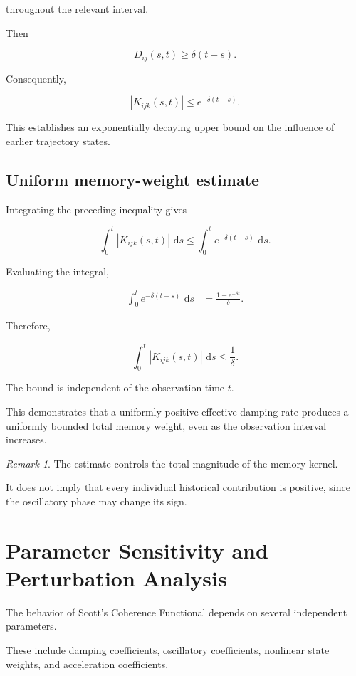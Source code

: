 \documentclass[12pt]{article}
\numberwithin{equation}{section}
\newcommand{\dd}{\,\mathrm{d}}
\theoremstyle{definition}
\theoremstyle{remark}
\newtheorem{remark}[theorem]{Remark}
\begin{document}
throughout the relevant interval.

Then

\[
D_{ij}(s,t)
\geq\delta(t-s).
\]

Consequently,

\[
|K_{ijk}(s,t)|
\leq e^{-\delta(t-s)}.
\]

This establishes an exponentially decaying
upper bound on the influence of earlier
trajectory states.

\subsection{Uniform memory-weight estimate}

Integrating the preceding inequality gives

\[
\int_0^t
|K_{ijk}(s,t)|\,\dd s
\leq
\int_0^t
e^{-\delta(t-s)}\,\dd s.
\]

Evaluating the integral,

\[
\begin{aligned}
\int_0^t
e^{-\delta(t-s)}\,\dd s
&=
\frac{1-e^{-\delta t}}{\delta}.
\end{aligned}
\]

Therefore,

\[
\int_0^t
|K_{ijk}(s,t)|\,\dd s
\leq\frac{1}{\delta}.
\]

The bound is independent of the observation
time \(t\).

This demonstrates that a uniformly positive
effective damping rate produces a uniformly
bounded total memory weight, even as the
observation interval increases.

\begin{remark}

The estimate controls the total magnitude
of the memory kernel.

It does not imply that every individual
historical contribution is positive, since
the oscillatory phase may change its sign.

\end{remark}


\section{Parameter Sensitivity and Perturbation Analysis}

The behavior of Scott's Coherence Functional
depends on several independent parameters.

These include damping coefficients,
oscillatory coefficients, nonlinear state
weights, and acceleration coefficients.
\end{document}
